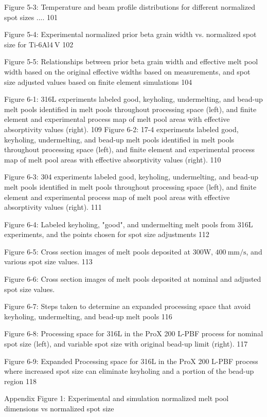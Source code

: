 \documentclass[10pt]{article}
\begin{document}
Figure 5-3: Temperature and beam profile distributions for different normalized spot sizes .... 101

Figure 5-4: Experimental normalized prior beta grain width vs. normalized spot size for Ti-6Al$4 \mathrm{~V}$ 102

Figure 5-5: Relationships between prior beta grain width and effective melt pool width based on the original effective widths based on measurements, and spot size adjusted values based on finite element simulations 104

Figure 6-1: 316L experiments labeled good, keyholing, undermelting, and bead-up melt pools identified in melt pools throughout processing space (left), and finite element and experimental process map of melt pool areas with effective absorptivity values (right). 109 Figure 6-2: 17-4 experiments labeled good, keyholing, undermelting, and bead-up melt pools identified in melt pools throughout processing space (left), and finite element and experimental process map of melt pool areas with effective absorptivity values (right). 110

Figure 6-3: 304 experiments labeled good, keyholing, undermelting, and bead-up melt pools identified in melt pools throughout processing space (left), and finite element and experimental process map of melt pool areas with effective absorptivity values (right). 111

Figure 6-4: Labeled keyholing, "good", and undermelting melt pools from 316L experiments, and the points chosen for spot size adjustments 112

Figure 6-5: Cross section images of melt pools deposited at 300W, $400 \mathrm{~mm} / \mathrm{s}$, and various spot size values. 113

Figure 6-6: Cross section images of melt pools deposited at nominal and adjusted spot size values.

Figure 6-7: Steps taken to determine an expanded processing space that avoid keyholing, undermelting, and bead-up melt pools 116

Figure 6-8: Processing space for 316L in the ProX 200 L-PBF process for nominal spot size (left), and variable spot size with original bead-up limit (right). 117

Figure 6-9: Expanded Processing space for 316L in the ProX 200 L-PBF process where increased spot size can eliminate keyholing and a portion of the bead-up region 118

Appendix Figure 1: Experimental and simulation normalized melt pool dimensions vs normalized spot size
\end{document}
